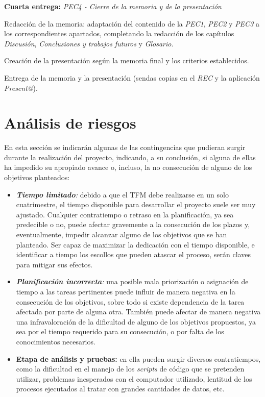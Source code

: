 \documentclass[IB,BIB]{TFUOC}%
\begin{document}
\begin{todolist}
  \item \textbf{Cuarta entrega:} \textit{PEC4 - Cierre de la memoria y de la presentación}
  \begin{todolist}
  \item Redacción de la memoria: adaptación del contenido de la \textit{PEC1}, \textit{PEC2} y \textit{PEC3} a los correspondientes apartados, completando la redacción de los capítulos  \textit{Discusión}, \textit{Conclusiones y trabajos futuros} y \textit{Glosario}.
  \item Creación de la presentación según la memoria final y los criterios establecidos.
  \item Entrega de la memoria y la presentación (sendas copias en el \textit{REC} y la aplicación \textit{Present@}).
  \end{todolist}
\end{todolist}

\normalsize


\section{Análisis de riesgos}
\label{sec:Análisis de riesgos}

En esta sección se indicarán algunas de las contingencias que pudieran surgir durante la realización del proyecto, indicando, a su conclusión, si alguna de ellas ha impedido su apropiado avance o, incluso, la no consecución de alguno de los objetivos planteados:

\footnotesize

\begin{itemize}
\item \textit{\textbf{Tiempo limitado}:} debido a que el TFM debe realizarse en un solo cuatrimestre, el tiempo disponible para desarrollar el proyecto suele ser muy ajustado. Cualquier contratiempo o retraso en la planificación, ya sea predecible o no, puede afectar gravemente a la consecución de los plazos y, eventualmente, impedir alcanzar alguno de los objetivos que se han planteado. Ser capaz de maximizar la dedicación con el tiempo disponible, e identificar a tiempo los escollos que pueden atascar el proceso, serán claves para mitigar sus efectos.
\item \textit{\textbf{Planificación incorrecta}:} una posible mala priorización o asignación de tiempo a las tareas pertinentes puede influir de manera negativa en la consecución de los objetivos, sobre todo si existe dependencia de la tarea afectada por parte de alguna otra. También puede afectar de manera negativa una infravaloración de la dificultad de alguno de los objetivos propuestos, ya sea por el tiempo requerido para su consecución, o por falta de los conocimientos necesarios.
\item \textbf{Etapa de análisis y pruebas:} en ella pueden surgir diversos contratiempos, como la dificultad en el manejo de los \textit{scripts} de código que se pretenden utilizar, problemas inesperados con el computador utilizado, lentitud de los procesos ejecutados al tratar con grandes cantidades de datos, etc.
\end{itemize}
\end{document}
